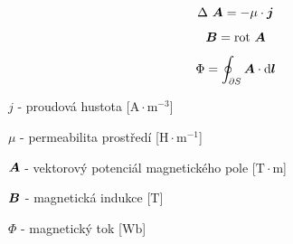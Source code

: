 \begin{fact}
\begin{equation}
\Delta \ \boldsymbol{A} = -\mu \cdot \boldsymbol{j}
\end{equation}

\begin{equation}
\boldsymbol{B} = \mathrm{rot} \ \boldsymbol{A}
\end{equation}

\begin{equation}
\Phi = \oint_{\partial S} \boldsymbol{A} \cdot \mathrm{d}\boldsymbol{l}
\end{equation}

\(j\) - proudová hustota [\(\mathrm{A} \cdot \mathrm{m}^{-3}\)]

\(\mu\) - permeabilita prostředí [\(\mathrm{H} \cdot \mathrm{m}^{-1}\)]

\(\boldsymbol{A}\) - vektorový potenciál magnetického pole [\(\mathrm{T} \cdot \mathrm{m}\)]

\(\boldsymbol{B}\) - magnetická indukce [\(\mathrm{T}\)]

\(\Phi\) - magnetický tok [\(\mathrm{Wb}\)]
\end{fact}
